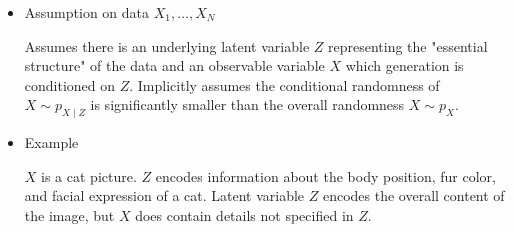 \begin{itemize}
    \item
    Assumption on data $X_{1}, \ldots, X_{N}$

    Assumes there is an underlying latent variable $Z$ representing the "essential structure" of the data and an observable variable $X$ which generation is conditioned on $Z$. Implicitly assumes the conditional randomness of $X \sim p_{X \mid Z}$ is significantly smaller than the overall randomness $X \sim p_{X}$.
    \item
    Example

    $X$ is a cat picture. $Z$ encodes information about the body position, fur color, and facial expression of a cat. Latent variable $Z$ encodes the overall content of the image, but $X$ does contain details not specified in $Z$.
\end{itemize}

